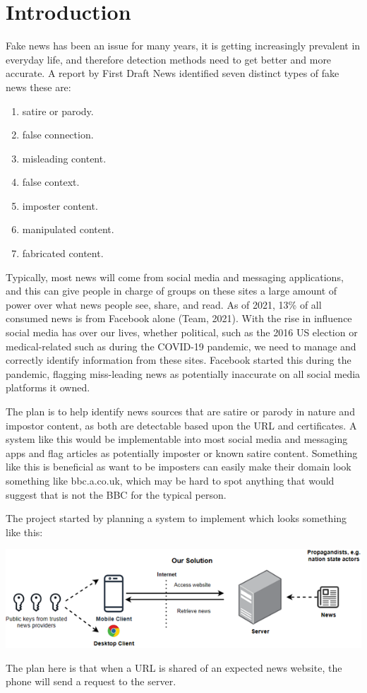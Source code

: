 \documentclass[11pt,a4paper]{report}
\begin{document}
\section{Introduction}
Fake news has been an issue for many years, it is getting increasingly prevalent in everyday life, and therefore detection methods need to get better and more accurate. A report by First Draft News \citep{Fakenews} identified seven distinct types of fake news these are:
\begin{enumerate}
  \item satire or parody.
  \item false connection.
  \item misleading content.
  \item false context.
  \item imposter content.
  \item manipulated content.
  \item fabricated content.
\end{enumerate}
Typically, most news will come from social media and messaging applications, and this can give people in charge of groups on these sites a large amount of power over what news people see, share, and read. As of 2021, 13\% of all consumed news is from Facebook alone (Team, 2021). With the rise in influence social media has over our lives, whether political, such as the 2016 US election or medical-related such as during the COVID-19 pandemic, we need to manage and correctly identify information from these sites. Facebook started this during the pandemic, flagging miss-leading news as potentially inaccurate on all social media platforms it owned.

The plan is to help identify news sources that are satire or parody in nature and impostor content, as both are detectable based upon the URL and certificates. A system like this would be implementable into most social media and messaging apps and flag articles as potentially imposter or known satire content. Something like this is beneficial as want to be imposters can easily make their domain look something like bbc.a.co.uk, which may be hard to spot anything that would suggest that is not the BBC for the typical person.

The project started by planning a system to implement which looks something like this:
\begin{center}
\includegraphics[width=1\textwidth]{image/diagram.png}
\end{center}
The plan here is that when a URL is shared of an expected news website, the phone will send a request to the server.
\end{document}
